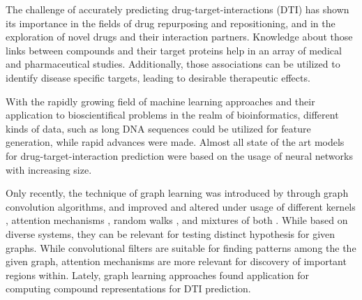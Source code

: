 \documentclass{bioinfo}
\renewcommand{\cite}{\citep}
\begin{document}
The challenge of accurately predicting drug-target-interactions (DTI)
has shown its importance in the fields of drug repurposing and
repositioning, and in the exploration of novel drugs and their
interaction partners. Knowledge about those links between compounds
and their target proteins help in an array of medical and
pharmaceutical studies. Additionally, those associations can be
utilized to identify disease specific targets, leading to desirable
therapeutic effects.

With the rapidly growing field of machine learning approaches and
their application to bioscientifical problems in the realm of
bioinformatics, different kinds of data, such as long DNA sequences
could be utilized for feature generation, while rapid advances were
made. Almost all state of the art models for drug-target-interaction
prediction were based on the usage of neural networks with increasing
size.

Only recently, the technique of graph learning was introduced by
\citet{GCNConv} through graph convolution algorithms, and improved and
altered under usage of different kernels \cite{ChebConv, ARMAConv},
attention mechanisms \cite{GATConv}, random walks \cite{APPNPConv},
and mixtures of both \cite{SAGEConv}. While based on diverse systems,
they can be relevant for testing distinct hypothesis for given
graphs. While convolutional filters are suitable for finding patterns
among the the given graph, attention mechanisms are more relevant for
discovery of important regions within. Lately, graph learning
approaches found application for computing compound representations
for DTI prediction.
\end{document}
